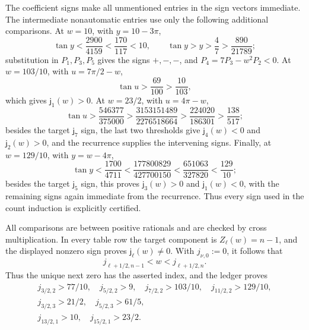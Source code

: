 \documentclass[11pt]{article}
\numberwithin{equation}{section}
\theoremstyle{definition}
\theoremstyle{remark}
\begin{document}
The coefficient signs make all unmentioned entries in the sign vectors
immediate.  The intermediate nonautomatic entries use only the following
additional comparisons.  At \(w=10\), with \(y=10-3\pi\),
\[
 \tan y<\frac{2900}{4159}<\frac{170}{117}<10,
 \qquad
 \tan y>y>\frac47>\frac{890}{21789};
\]
substitution in \(P_1,P_3,P_5\) gives the signs \(+,-,-\), and
\(P_4=7P_3-w^2P_2<0\).  At \(w=103/10\), with
\(u=7\pi/2-w\),
\[
 \tan u>\frac{69}{100}>\frac{10}{103},
\]
which gives \(\mathsf j_1(w)>0\).  At \(w=23/2\), with
\(u=4\pi-w\),
\[
 \tan u>\frac{546377}{375000}>
 \frac{3153151489}{2276518664}>
 \frac{224020}{186301}>\frac{138}{517};
\]
besides the target \(\mathsf j_7\) sign, the last two thresholds give
\(\mathsf j_4(w)<0\) and \(\mathsf j_2(w)>0\), and the recurrence supplies
the intervening signs.  Finally, at \(w=129/10\), with \(y=w-4\pi\),
\[
 \tan y<\frac{1700}{4711}<
 \frac{177800829}{427700150}<
 \frac{651063}{327820}<\frac{129}{10};
\]
besides the target \(\mathsf j_5\) sign, this proves
\(\mathsf j_3(w)>0\) and \(\mathsf j_1(w)<0\), with the remaining signs
again immediate from the recurrence.  Thus every sign used in the count
induction is explicitly certified.

All comparisons are between positive rationals and are checked by cross
multiplication.  In every table row the target component is
\(Z_\ell(w)=n-1\), and the displayed nonzero sign proves
\(\mathsf j_\ell(w)\ne0\).  With \(j_{\nu,0}:=0\), it follows that
\[
 j_{\ell+1/2,n-1}<w<j_{\ell+1/2,n}.
\]
Thus the unique next zero has the asserted index, and the ledger proves
\begin{equation}
\begin{gathered}
 j_{3/2,2}>77/10,\quad j_{5/2,2}>9,\quad
 j_{7/2,2}>103/10,\quad j_{11/2,2}>129/10,\\
 j_{3/2,3}>21/2,\quad j_{5/2,3}>61/5,\\
 j_{13/2,1}>10,\quad j_{15/2,1}>23/2.
\end{gathered}
 \label{cm:eq-internal-zero-registry}
\end{equation}
\end{document}
